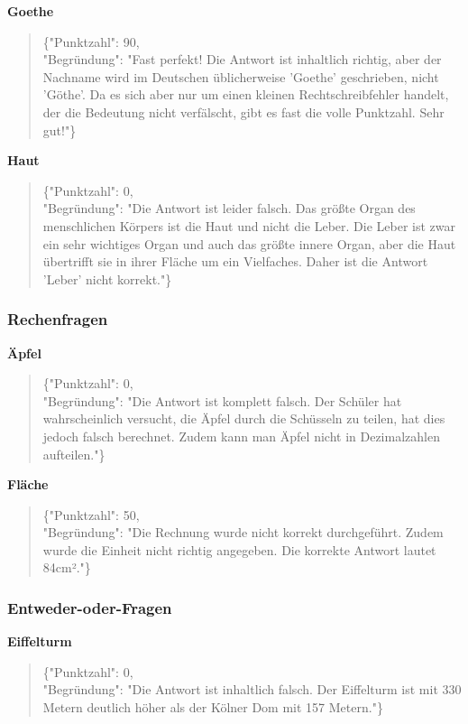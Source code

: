 \documentclass[a4paper,12pt]{article}
\begin{document}
\textbf{Goethe}
\begin{quote}
\{"Punktzahl": 90,\\
"Begründung": "Fast perfekt! Die Antwort ist inhaltlich richtig, aber der Nachname wird im Deutschen üblicherweise 'Goethe' geschrieben, nicht 'Göthe'. Da es sich aber nur um einen kleinen Rechtschreibfehler handelt, der die Bedeutung nicht verfälscht, gibt es fast die volle Punktzahl. Sehr gut!"\}
\end{quote}

\textbf{Haut}
\begin{quote}
\{"Punktzahl": 0,\\
"Begründung": "Die Antwort ist leider falsch. Das größte Organ des menschlichen Körpers ist die Haut und nicht die Leber. Die Leber ist zwar ein sehr wichtiges Organ und auch das größte innere Organ, aber die Haut übertrifft sie in ihrer Fläche um ein Vielfaches. Daher ist die Antwort 'Leber' nicht korrekt."\}
\end{quote}

\subsubsection{Rechenfragen}

\textbf{Äpfel}
\begin{quote}
\{"Punktzahl": 0,\\
"Begründung": "Die Antwort ist komplett falsch. Der Schüler hat wahrscheinlich versucht, die Äpfel durch die Schüsseln zu teilen, hat dies jedoch falsch berechnet. Zudem kann man Äpfel nicht in Dezimalzahlen aufteilen."\}
\end{quote}

\textbf{Fläche}
\begin{quote}
\{"Punktzahl": 50,\\
"Begründung": "Die Rechnung wurde nicht korrekt durchgeführt. Zudem wurde die Einheit nicht richtig angegeben. Die korrekte Antwort lautet 84cm²."\}
\end{quote}

\subsubsection{Entweder-oder-Fragen}

\textbf{Eiffelturm}
\begin{quote}
\{"Punktzahl": 0,\\
"Begründung": "Die Antwort ist inhaltlich falsch. Der Eiffelturm ist mit 330 Metern deutlich höher als der Kölner Dom mit 157 Metern."\}
\end{quote}
\end{document}
